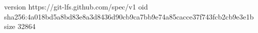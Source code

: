version https://git-lfs.github.com/spec/v1
oid sha256:4a018bd5a8bd83e8a3d8436d90cb9ca7bb9e74a85cacce37f743fcb2cb9e3e1b
size 32864
